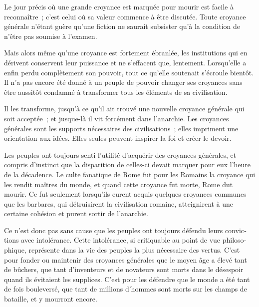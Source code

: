 \documentclass[french,twoside]{book} %
\begin{document}
Le jour précis où une grande croyance est marquée pour mourir est facile à reconnaître ; c’est celui où sa valeur commence à être discutée. Toute croyance géné­rale n’étant guère qu’une fiction ne saurait subsister qu’à la condition de n’être pas soumise à l’examen.\par
Mais alors même qu’une croyance est fortement ébranlée, les institutions qui en dérivent conservent leur puissance et ne s’effacent que, lentement. Lorsqu’elle a enfin perdu complètement son pouvoir, tout ce qu’elle soutenait s’écroule bientôt. Il n’a pas encore été donné à un peuple de pouvoir changer ses croyances sans être aussitôt condamné à transformer tous les éléments de sa civilisation.\par
Il les transforme, jusqu’à ce qu’il ait trouvé une nouvelle croyance générale qui soit acceptée ; et jusque-là il vit forcément dans l’anarchie. Les croyances générales sont les supports nécessaires des civilisations ; elles impriment une orientation aux idées. Elles seules peuvent inspirer la foi et créer le devoir.\par
Les peuples ont toujours senti l’utilité d’acquérir des croyances générales, et compris d’instinct que la disparition de celles-ci devait marquer pour eux l’heure de la décadence. Le culte fanatique de Rome fut pour les Romains la croyance qui les rendit maîtres du monde, et quand cette croyance fut morte, Rome dut mourir. Ce fut seulement lorsqu’ils eurent acquis quelques croyances communes que les barbares, qui détruisirent la civilisation romaine, atteignirent à une certaine cohésion et purent sortir de l’anarchie.\par
Ce n’est donc pas sans cause que les peuples ont toujours défendu leurs convic­tions avec intolérance. Cette intolérance, si critiquable au point de vue philoso­phique, représente dans la vie des peuples la plus nécessaire des vertus. C’est pour fonder ou maintenir des croyances générales que le moyen âge a élevé tant de bûchers, que tant d’inventeurs et de novateurs sont morts dans le désespoir quand ils évitaient les supplices. C’est pour les défendre que le monde a été tant de fois bouleversé, que tant de millions d’hommes sont morts sur les champs de bataille, et y mourront encore.\par
\end{document}
